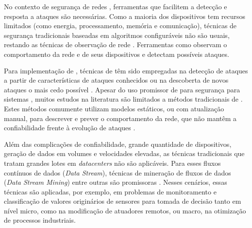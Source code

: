 No contexto de segurança de redes \iot, ferramentas que facilitem a detecção e
resposta a ataques são necessárias.
Como a maioria dos dispositivos \iot tem recursos limitados (como energia,
processamento, memória e comunicação), técnicas de segurança tradicionais
baseadas em algoritmos configuráveis não são usuais, restando as
técnicas de observação de rede \cite{Zhou2017}.
Ferramentas como \nids observam o comportamento da rede e de seus dispositivos
e detectam possíveis ataques.
% 

Para implementação de \nids, técnicas de \ml têm sido empregadas na detecção de
ataques a partir de características de ataques conhecidos ou na
descoberta de novos ataques o mais cedo possível
\cite{buczak2016survey,mitchell2014survey}.
Apesar do uso promissor de \ml para segurança para sistemas \iot, muitos estudos
na literatura \cite{buczak2016survey,mitchell2014survey,Tahsien2020} são
limitados a métodos tradicionais de \ml.
Estes métodos comumente utilizam modelos estáticos, ou com atualização manual,
para descrever e prever o comportamento da rede, que não mantêm a confiabilidade
frente à evolução de ataques \cite{Viegas2019,AndreoniLopez2019}.


Além das complicações de confiabilidade, grande quantidade de dispositivos,
geração de dados em volumes e velocidades elevadas, as técnicas
tradicionais que tratam grandes lotes em \emph{datacenters} não são aplicáveis.
Para esses fluxos contínuos de dados (\emph{Data Stream}), técnicas de
mineração de fluxos de dados (\emph{Data Stream Mining}) entre outras são
promissoras \cite{AriyaluranHabeeb2019,Faria2016ndds,Akbar2017}.
% 
Nesses cenários, essas técnicas são aplicadas, por exemplo, em problemas de
monitoramento e classificação de valores originários de sensores para tomada de
decisão tanto em nível micro, como na modificação de atuadores remotos, ou
macro, na otimização de processos industriais.
% 

